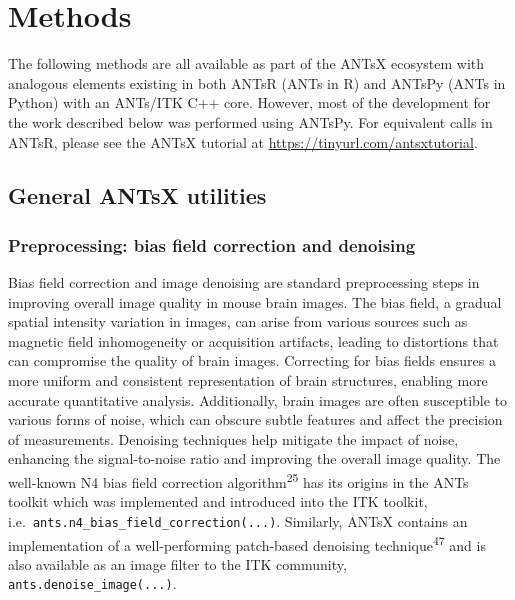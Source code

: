 \documentclass[
  12pt,
]{article}
\begin{document}
\clearpage
\newpage

\hypertarget{methods}{%
\section{Methods}\label{methods}}

The following methods are all available as part of the ANTsX ecosystem
with analogous elements existing in both ANTsR (ANTs in R) and ANTsPy
(ANTs in Python) with an ANTs/ITK C++ core. However, most of the
development for the work described below was performed using ANTsPy. For
equivalent calls in ANTsR, please see the ANTsX tutorial at
\url{https://tinyurl.com/antsxtutorial}.

\hypertarget{general-antsx-utilities}{%
\subsection{General ANTsX utilities}\label{general-antsx-utilities}}

\hypertarget{preprocessing-bias-field-correction-and-denoising}{%
\subsubsection{Preprocessing: bias field correction and
denoising}\label{preprocessing-bias-field-correction-and-denoising}}

Bias field correction and image denoising are standard preprocessing
steps in improving overall image quality in mouse brain images. The bias
field, a gradual spatial intensity variation in images, can arise from
various sources such as magnetic field inhomogeneity or acquisition
artifacts, leading to distortions that can compromise the quality of
brain images. Correcting for bias fields ensures a more uniform and
consistent representation of brain structures, enabling more accurate
quantitative analysis. Additionally, brain images are often susceptible
to various forms of noise, which can obscure subtle features and affect
the precision of measurements. Denoising techniques help mitigate the
impact of noise, enhancing the signal-to-noise ratio and improving the
overall image quality. The well-known N4 bias field correction
algorithm\textsuperscript{25} has its origins in the ANTs toolkit which
was implemented and introduced into the ITK toolkit,
i.e.~\texttt{ants.n4\_bias\_field\_correction(...)}. Similarly, ANTsX
contains an implementation of a well-performing patch-based denoising
technique\textsuperscript{47} and is also available as an image filter
to the ITK community, \texttt{ants.denoise\_image(...)}.
\end{document}

